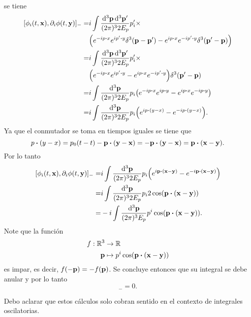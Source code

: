 \documentclass{article}
\begin{document}
se tiene
\begin{align}
\begin{split}
[\phi_i(t,\vb{x}),\partial_i\phi(t,\vb{y})]_-=&i\int\frac{\dd[3]{\vb{p}}\dd[3]{\vb{p'}}}{(2\pi)^32E_p}p_i'\times\\
&\qty(e^{-ip\vdot x}e^{ip'\vdot y}\delta^{3}(\vb{p}-\vb{p}')-e^{ip\vdot x}e^{-ip'\vdot y}\delta^{3}(\vb{p}'-\vb{p}))\\
=&i\int\frac{\dd[3]{\vb{p}}\dd[3]{\vb{p'}}}{(2\pi)^32E_p}p_i'\times\\
&\qty(e^{-ip\vdot x}e^{ip'\vdot y}-e^{ip\vdot x}e^{-ip'\vdot y})\delta^{3}(\vb{p}'-\vb{p})\\
=&i\int\frac{\dd[3]{\vb{p}}}{(2\pi)^32E_p}p_i\qty(e^{-ip\vdot x}e^{ip\vdot y}-e^{ip\vdot x}e^{-ip\vdot y})\\
=&i\int\frac{\dd[3]{\vb{p}}}{(2\pi)^32E_p}p_i\qty(e^{ip\vdot(y- x)}-e^{-ip\vdot(y- x)}).
\end{split}
\end{align}
Ya que el conmutador se toma en tiempos iguales se tiene que
\begin{equation}
p\vdot(y-x)=p_0(t-t)-\vb{p}\vdot(\vb{y}-\vb{x})=-\vb{p}\vdot(\vb{y}-\vb{x})=\vb{p}\vdot(\vb{x}-\vb{y}).
\end{equation}
Por lo tanto
\begin{align}
\begin{split}
[\phi_i(t,\vb{x}),\partial_i\phi(t,\vb{y})]_-=&i\int\frac{\dd[3]{\vb{p}}}{(2\pi)^32E_p}p_i\qty(e^{i\vb{p}\vdot(\vb{x}-\vb{y})}-e^{-i\vb{p}\vdot(\vb{x}-\vb{y})})\\
=&i\int\frac{\dd[3]{\vb{p}}}{(2\pi)^32E_p}p_i2\cos(\vb{p}\vdot(\vb{x}-\vb{y}))\\
=&-i\int\frac{\dd[3]{\vb{p}}}{(2\pi)^3E_p}p^i\cos(\vb{p}\vdot(\vb{x}-\vb{y})).
\end{split}
\end{align}
Note que la función
\begin{align}
\begin{split}
f:\mathbb{R}^3&\rightarrow\mathbb{R}\\
\vb{p}&\mapsto p^i\cos(\vb{p}\vdot(\vb{x}-\vb{y}))
\end{split}
\end{align}
es impar, es decir, $f(-\vb{p})=-f(\vb{p})$. Se concluye entonces que su integral se debe anular y por lo tanto
\begin{equation}
[\phi_i(t,\vb{x}),\partial_i\phi(t,\vb{y})]_-=0.
\end{equation}

Debo aclarar que estos cálculos solo cobran sentido en el contexto de integrales oscilatorias.
\end{document}
